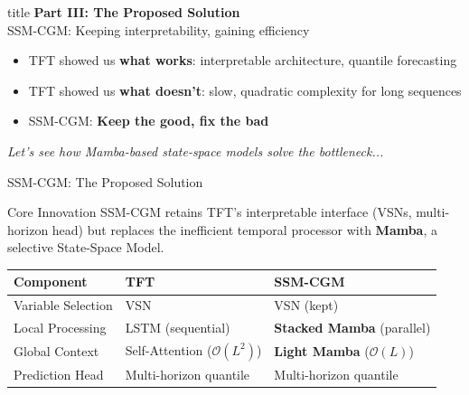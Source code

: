 \documentclass[aspectratio=169,xcolor=dvipsnames]{beamer}
\begin{document}
\begin{frame}[plain]
    \centering
    \vfill
    \begin{beamercolorbox}[center,shadow=true,rounded=true]{title}
        \textbf{Part III: The Proposed Solution}\\
        \vspace{0.5em}
        \large SSM-CGM: Keeping interpretability, gaining efficiency
    \end{beamercolorbox}
    \vfill
    
    \vspace{1em}
    \normalsize
    \begin{itemize}
        \item TFT showed us \textbf{what works}: interpretable architecture, quantile forecasting
        \item TFT showed us \textbf{what doesn't}: slow, quadratic complexity for long sequences
        \item SSM-CGM: \textbf{Keep the good, fix the bad}
    \end{itemize}
    
    \vspace{1em}
    \textit{Let's see how Mamba-based state-space models solve the bottleneck...}
\end{frame}

\begin{frame}{SSM-CGM: The Proposed Solution}
    \begin{block}{Core Innovation}
        SSM-CGM retains TFT's interpretable interface (VSNs, multi-horizon head) but replaces the inefficient temporal processor with \textbf{Mamba}, a selective State-Space Model.
    \end{block}
    
    \begin{center}
        \begin{tabular}{p{} p{} p{}}
            \toprule
            \textbf{Component} & \textbf{TFT} & \textbf{SSM-CGM} \\
            \midrule
            Variable Selection & VSN & VSN (kept) \\
            \midrule
            Local Processing & LSTM (sequential) & \textbf{Stacked Mamba} (parallel) \\
            \midrule
            Global Context & Self-Attention ($\mathcal{O}(L^2)$) & \textbf{Light Mamba} ($\mathcal{O}(L)$) \\
            \midrule
            Prediction Head & Multi-horizon quantile & Multi-horizon quantile \\
            \bottomrule
        \end{tabular}
    \end{center}
\end{frame}
\end{document}
